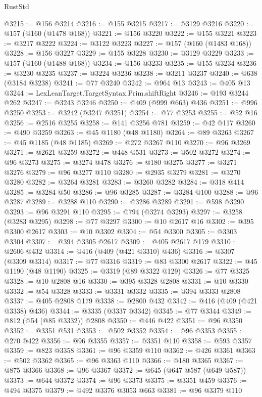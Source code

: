 \begin{lexlean}{RustStd}
\begin{coremodule}
@3215 := @156 @3214
@3216 := @155 @3215
@3217 := @3129 @3216
@3220 := @157 (@160 (@1478 @168))
@3221 := @156 @3220
@3222 := @155 @3221
@3223 := @3217 @3222
@3224 := @3122 @3223
@3227 := @157 (@160 (@1483 @168))
@3228 := @156 @3227
@3229 := @155 @3228
@3230 := @3129 @3229
@3233 := @157 (@160 (@1488 @168))
@3234 := @156 @3233
@3235 := @155 @3234
@3236 := @3230 @3235
@3237 := @3224 @3236
@3238 := @3211 @3237
@3240 := @638 (@3184 @3238)
@3241 := @77 @3240
@3242 := @964 @13
@3243 := @405 @13
@3244 := LexLeanTarget.TargetSyntax.Prim.shiftRight
@3246 := @193 @3244 @262
@3247 := @3243 @3246
@3250 := @409 (@999 @663) @436
@3251 := @996 @3250
@3253 := @3242 (@3247 @3251)
@3254 := @77 @3253
@3255 := @52 @16
@3256 := @2516 @3255
@3258 := @141 @3256 @781
@3259 := @42 @117
@3260 := @490 @3259
@3263 := @45 @1180 (@48 @1180)
@3264 := @89 @3263
@3267 := @45 @1185 (@48 @1185)
@3269 := @272 @3267 @110
@3270 := @96 @3269
@3271 := @2621 @3259
@3272 := @448 @531
@3273 := @502 @3272
@3274 := @96 @3273
@3275 := @3274 @478
@3276 := @180 @3275
@3277 := @3271 @3276
@3279 := @96 @3277 @110
@3280 := @2935 @3279
@3281 := @3270 @3280
@3282 := @3264 @3281
@3283 := @3260 @3282
@3284 := @318 @414
@3285 := @3284 @50
@3286 := @96 @3285
@3287 := @3284 @100
@3288 := @96 @3287
@3289 := @3288 @110
@3290 := @3286 @3289
@3291 := @598 @3290
@3293 := @96 @3291 @110
@3295 := @794 (@3274 @3293)
@3297 := @3258 (@3283 @3295)
@3298 := @77 @3297
@3300 := @10 @2617 @16
@3302 := @395 @3300 @2617
@3303 := @10 @3302
@3304 := @54 @3300
@3305 := @3303 @3304
@3307 := @394 @3305 @2617
@3309 := @405 @2617 @179
@3310 := @2606 @432
@3314 := @416 (@409 (@421 @3310) @436)
@3316 := @3307 (@3309 @3314)
@3317 := @77 @3316
@3319 := @83 @3300 @2617
@3322 := @45 @1190 (@48 @1190)
@3325 := @3319 (@89 @3322 @129)
@3326 := @77 @3325
@3328 := @10 @2808 @16
@3330 := @395 @3328 @2808
@3331 := @10 @3330
@3332 := @54 @3328
@3333 := @3331 @3332
@3335 := @394 @3333 @2808
@3337 := @405 @2808 @179
@3338 := @2800 @432
@3342 := @416 (@409 (@421 @3338) @436)
@3344 := @3335 (@3337 @3342)
@3345 := @77 @3344
@3349 := @812 (@54 (@85 @3332)) @2808
@3350 := @446 @422
@3351 := @96 @3350
@3352 := @3351 @531
@3353 := @502 @3352
@3354 := @96 @3353
@3355 := @270 @422
@3356 := @96 @3355
@3357 := @3351 @110
@3358 := @593 @3357
@3359 := @823 @3358
@3361 := @96 @3359 @110
@3362 := @426 @3361
@3363 := @502 @3362
@3365 := @96 @3363 @110
@3366 := @180 @3365
@3367 := @875 @3366
@3368 := @96 @3367
@3372 := @645 (@647 @587 (@649 @587))
@3373 := @644 @3372
@3374 := @96 @3373
@3375 := @3351 @459
@3376 := @494 @3375
@3379 := @492 @3376 @3053 @663
@3381 := @96 @3379 @110

\end{coremodule}
\end{lexlean}
